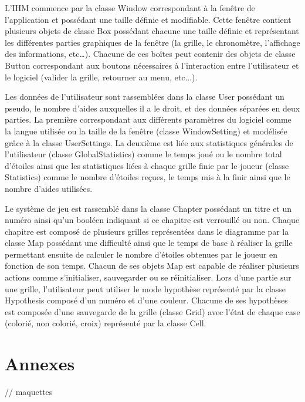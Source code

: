 \documentclass{report}
\begin{document}
	L’IHM commence par la classe Window  correspondant à la fenêtre de l’application et possédant une taille définie et modifiable. Cette fenêtre contient plusieurs objets de classe Box possédant chacune une taille définie et représentant les différentes parties graphiques de la fenêtre (la grille, le chronomètre, l’affichage des informations, etc…). Chacune de ces boîtes peut contenir des objets de classe Button correspondant aux boutons nécessaires à l’interaction entre l’utilisateur et le logiciel (valider la grille, retourner au menu, etc...).

	Les données de l’utilisateur sont rassemblées dans la classe User possédant un pseudo, le nombre d’aides auxquelles il a le droit, et des données séparées en deux parties. La première correspondant aux différents paramètres du logiciel comme la langue utilisée ou la taille de la fenêtre (classe WindowSetting) et modélisée grâce à la classe UserSettings. La deuxième est liée aux statistiques  générales de l’utilisateur (classe GlobalStatistics) comme le temps joué ou le nombre total d’étoiles ainsi que les statistiques liées à chaque grille finie par le joueur (classe Statistics) comme le nombre d’étoiles reçues, le temps mis à la finir ainsi que le nombre d’aides utilisées.

 	Le système de jeu est rassemblé dans la classe Chapter possédant un titre et un numéro ainsi qu’un booléen indiquant si ce chapitre est verrouillé ou non. Chaque chapitre est composé de plusieurs grilles représentées dans le diagramme par la classe Map possédant une difficulté ainsi que le temps de base à réaliser la grille permettant ensuite de calculer le nombre d’étoiles obtenues par le joueur en fonction de son temps. Chacun de ses objets Map est capable de réaliser plusieurs actions comme s’initialiser, sauvegarder ou se réinitialiser. Lors d’une partie sur une grille, l’utilisateur peut utiliser le mode hypothèse représenté par la classe Hypothesis composé d’un numéro et d’une couleur. Chacune de ses hypothèses est composée d’une sauvegarde de la grille (classe Grid) avec l’état de chaque case (colorié, non colorié, croix) représenté par la classe Cell.


\chapter{Annexes}

      // maquettes
\end{document}
